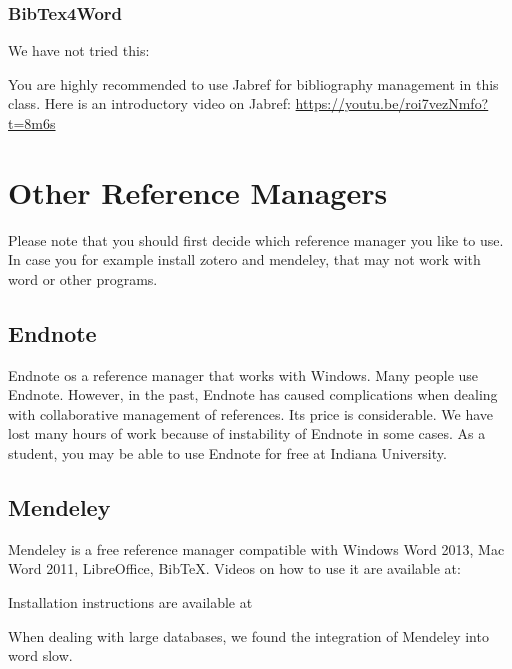 \subsubsection{BibTex4Word}

We have not tried this:



You are highly recommended to use Jabref for bibliography management in
this class. Here is an introductory video on Jabref:
\url{https://youtu.be/roi7vezNmfo?t=8m6s}

\section{Other Reference Managers}

Please note that you should first decide which reference manager you
like to use. In case you for example install zotero and mendeley, that
may not work with word or other programs.

\subsection{Endnote}

Endnote os a reference manager that works with Windows. Many people use
Endnote. However, in the past, Endnote has caused complications when
dealing with collaborative management of references. Its price is
considerable. We have lost many hours of work because of instability of
Endnote in some cases. As a student, you may be able to use Endnote for
free at Indiana University.



\subsection{Mendeley}

Mendeley is a free reference manager compatible with Windows Word 2013,
Mac Word 2011, LibreOffice, BibTeX. Videos on how to use it are
available at:



Installation instructions are available at



When dealing with large databases, we found the integration of Mendeley
into word slow.

